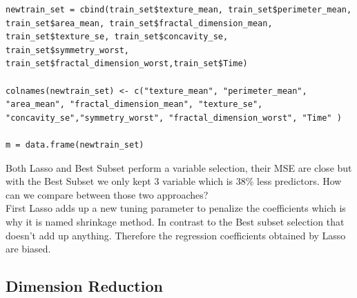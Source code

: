 \documentclass[]{report}
\begin{document}
\begin{lstlisting}
newtrain_set = cbind(train_set$texture_mean, train_set$perimeter_mean, train_set$area_mean, train_set$fractal_dimension_mean,
train_set$texture_se, train_set$concavity_se, train_set$symmetry_worst, train_set$fractal_dimension_worst,train_set$Time)

colnames(newtrain_set) <- c("texture_mean", "perimeter_mean", "area_mean", "fractal_dimension_mean", "texture_se",
"concavity_se","symmetry_worst", "fractal_dimension_worst", "Time" )

m = data.frame(newtrain_set)
\end{lstlisting}

Both Lasso and Best Subset perform a variable selection, their MSE are close but with the Best Subset we only kept 3 variable which is 38\% less predictors. How can we compare between those two approaches?\\
First Lasso adds up a new tuning parameter to penalize the coefficients which is why it is named shrinkage method. In contrast to the Best subset selection that doesn't add up anything. Therefore the regression coefficients obtained by Lasso are biased.
\subsection{Dimension Reduction}
\end{document}

